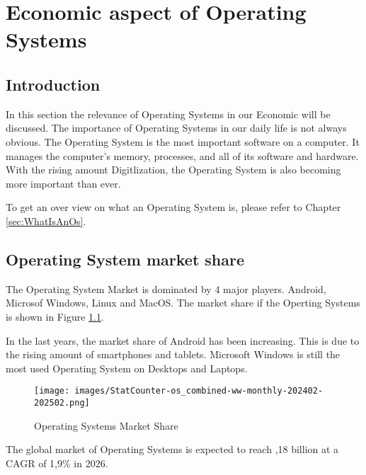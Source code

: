 \chapter{Economic aspect of Operating Systems }
\label{chap:Economic_aspekt_of_Operating_Systems}


\section{Introduction}

In this section the relevance of Operating Systems in our Economic will be discussed. The importance of Operating Systems in our daily life is not always obvious.
The Operating System is the most important software on a computer. It manages the computer's memory, processes, and all of its software and hardware. 
With the rising amount Digitlization, the Operating System is also becoming more important than ever.

To get an over view on what an Operating System is, please refer to Chapter \ref{sec:WhatIsAnOs}.


\section{Operating System market share}

The Operating System Market is dominated by 4 major players. Android, Microsof Windows, Linux and MacOS.
The market share if the Operting Systems is shown in Figure \ref{fig:Operating_Systems_Market_Share}. 

In the last years, the market share of Android has been increasing. This is due to the rising amount of smartphones and tablets.
Microsoft Windows is still the most used Operating System on Desktops and Laptops.

\begin{figure}[H]
    \centering
    \texttt{[image: images/StatCounter-os\_combined-ww-monthly-202402-202502.png]}
    \caption{Operating Systems Market Share}
    \label{fig:Operating_Systems_Market_Share}
\end{figure}
\cite{OsMarketShare2}

The global market of Operating Systems is expected to reach ,18 billion at a CAGR of 1,9\% in 2026. 
\cite{OsMarketShare3}



\cite{OsMarketShare}
\cite{OsWikipedia}
\author{Florian Prandstetter}